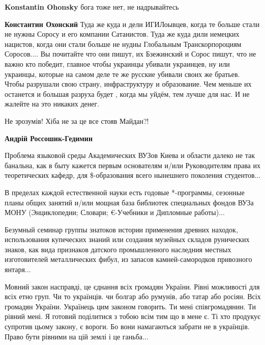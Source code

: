 \begin{itemize}
\begin{itemize}
\textbf{Konstantin Ohonsky} бога тоже нет, не надрывайтесь


\textbf{Константин Охонский} Туда же куда и дели ИГИЛоывцев, когда те больше
стали не нужны Соросу и его компании Сатанистов. Туда же куда дили немецких
нацистов, когда они стали больше не нудны Глобальным Транскорпороциям
Соросов.... Вы почитайте что они пишут, их Бзежинский и Сорос пишут, что не
важно кто победит, главное чтобы украинцы убивали украинцев, ну или украинцы,
которые на самом деле те же русские убивали своих же братьев. Чтобы разрушали
свою страну, инфраструктуру и образование. Чем меньше их останется и большая
разруха будет , когда мы уйдём, тем лучше для нас. И не жалейте на это никаких
денег.
\end{itemize}


Не зрозумів! Хіба не за це все стояв Майдан?!

\begin{itemize}

\textbf{Андрій Россошик-Гедимин}

Проблема языковой среды Академических ВУЗов Киева и области далеко не так
банальна, как в быту кажется первым основателям и/или Руководителям права их
теоретических кафедр, для \$-образования всего нынешнего поколения студентов...

В пределах каждой естественной науки есть годовые *-программы, сезонные планы
общих занятий и/или мощная база библиотек специальных фондов ВУЗа МОНУ
(Энциклопедии; Словари; €-Учебники и Дипломные работы)...

Безумный семинар группы знатоков истории применения древних находок,
использования купеческих знаний или создания музейных складов рунических
знаков, как вида признаков датского промышленного наследния местных
изготовителей металлических фибул, из запасов камней-самородков привозного
янтаря...

\end{itemize}



Мовний закон насправді, це єднання всіх громадян України. Рівні можливості для
всіх етно груп. Чи то українців. чи болгар або румунів, або татар або росіян.
Всіх громадян України. Українець цим законом говорить. Ти мені співгромадянин.
Ти рівний мені. Я готовий поділитися з тобою всім тим що в мене є. Ті хто
продукує супротив цьому закону, є вороги. Бо вони намагаються забрати не в
українців. Право бути рівними на цій землі і це ганьба...


\end{itemize}
